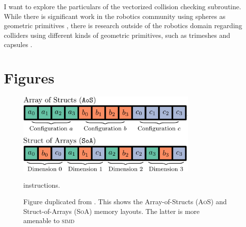 \documentclass{article}
\newcommand{\todo}[1]{\textbf{\color{red}#1}}
\begin{document}
I want to explore the particulars of the vectorized collision checking subroutine. While there is significant work in the robotics community using spheres as geometric primitives \cite{paper:cuRobo}, there is research outside of the robotics domain regarding colliders using different kinds of geometric primitives, such as trimeshes and capsules \cite{web:UE_cols}. 


\section{Figures}

\begin{figure}[h]
\includegraphics[width=0.8\textwidth]{./assets/soa_aos.png}
\caption{Figure duplicated from \cite{paper:MiM}. This shows the Array-of-Structs (\textsc{AoS}) and Struct-of-Arrays (\textsc{SoA}) memory layouts. The latter is more amenable to \textsc{simd}} instructions.
\label{fig:soa_aos}
\end{figure}
\end{document}
